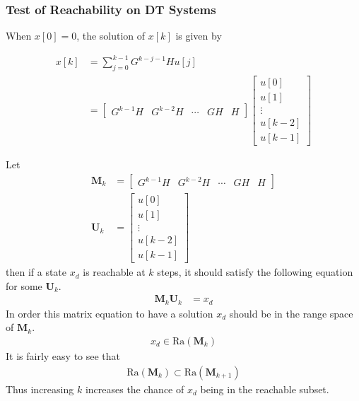 \documentclass[twoside]{article}
\begin{document}
\subsubsection*{Test of Reachability on DT Systems}

When $x[0] = 0$, the solution of $x[k]$ is given by

\begin{align*}
  x[k] &= \sum\limits_{j = 0}^{k-1} G^{k-j-1} H u[j]
         \\
&=
         \left[ \begin{array}{c|c|c|c|c} G^{k-1} H & G^{k-2} H &
         \cdots & G H & H \end{array} \right]
         \left[ \begin{array}{c}
                  u[0] \\ u[1] \\ \vdots \\ u[k-2] \\ u[k-1]
         \end{array} \right]
\end{align*}

Let 
\begin{align*}
 \mathbf{M}_k &= 
         \left[ \begin{array}{c|c|c|c|c} G^{k-1} H & G^{k-2} H &
         \cdots & G H & H \end{array} \right]
\\
 \mathbf{U}_k &=
         \left[ \begin{array}{c}
                  u[0] \\ u[1] \\ \vdots \\ u[k-2] \\ u[k-1]
         \end{array} \right]
\end{align*}
%
then if a state $x_d$ is reachable at $k$ steps, it should 
satisfy the following equation for some $\mathbf{U}_k$.
%
\begin{align*}
 \mathbf{M}_k \mathbf{U}_k &= x_d
\end{align*}
%
In order this matrix equation to have a solution $x_d$
should be in the range space of $\mathbf{M}_k$.
%
\begin{align*}
  x_d \in \mathrm{Ra} ( \mathbf{M}_k ) 
\end{align*}
%
It is fairly easy to see that 
%
\begin{align*}
  \mathrm{Ra} ( \mathbf{M}_k ) \subset \mathrm{Ra} ( \mathbf{M}_{k+1} )
\end{align*}
%
Thus increasing $k$ increases the chance of $x_d$ being in the
reachable subset. 
\end{document}
